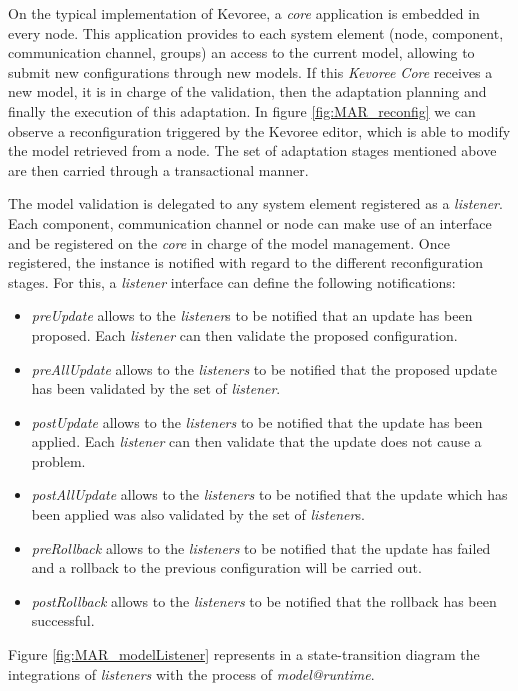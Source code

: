 On the typical implementation of Kevoree, a \textit{core} application is embedded in every node. 
This application provides to each system element (node, component, communication channel, groups) an access to the current model, allowing to submit new configurations through new models.
If this \textit{Kevoree Core} receives a new model, it is in charge of the validation, then the adaptation planning and finally the execution of this adaptation.
In figure \ref{fig:MAR_reconfig} we can observe a reconfiguration triggered by the Kevoree editor, which is able to modify the model retrieved from a node.  The set of adaptation stages mentioned above are then carried through a transactional manner.

The model validation is delegated to any system element registered as a \textit{listener}.
Each component, communication channel or node can make use of an interface and be registered on the \textit{core} in charge of the model management.
Once registered, the instance is notified with regard to the different reconfiguration stages.
For this, a \textit{listener} interface can define the following notifications:
\begin{itemize}
	\item \emph{preUpdate} allows to the \emph{listener}s to be notified that an update has been proposed.
	Each \emph{listener} can then validate the proposed configuration.
	\item \emph{preAllUpdate} allows to the \emph{listeners} to be notified that the proposed update has been validated by the set of \emph{listener}.
	\item \emph{postUpdate} allows to the \emph{listeners} to be notified that the update has been applied.
	Each \emph{listener} can then validate that the update does not cause a problem.
	\item \emph{postAllUpdate} allows to the \emph{listeners} to be notified that the update which has been applied was also validated by the set of \emph{listener}s.
	\item \emph{preRollback} allows to the \emph{listeners} to be notified that the update has failed and a rollback to the previous configuration will be carried out.
	\item \emph{postRollback} allows to the \emph{listeners} to be notified that the rollback has been successful.
\end{itemize}
Figure \ref{fig:MAR_modelListener} represents in a state-transition diagram the integrations of \textit{listeners} with the process of \textit{model@runtime}.

